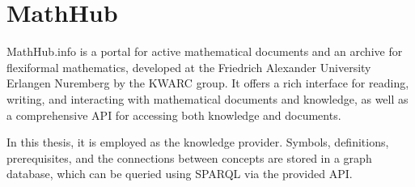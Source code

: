 \section{MathHub}
MathHub.info \cite{MathHub:on} is a portal for active mathematical documents and an archive for flexiformal mathematics,
developed at the Friedrich Alexander University Erlangen Nuremberg by the KWARC group.
It offers a rich interface for reading, writing, and interacting with mathematical documents and knowledge, 
as well as a comprehensive API for accessing both knowledge and documents.

In this thesis, it is employed as the knowledge provider. Symbols, definitions, prerequisites, and the connections between concepts are stored in a graph database, which can be queried using SPARQL via the provided API.

